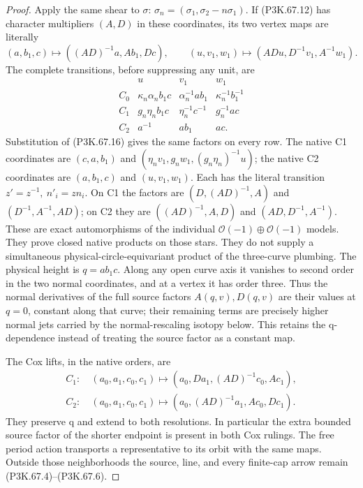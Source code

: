 \begin{proof}
Apply the same shear to \(\sigma\):
\(\sigma_n=(\sigma_1,\sigma_2-n\sigma_1)\). If (P3K.67.12) has
character multipliers \((A,D)\) in these coordinates, its two vertex
maps are literally
\[
 (a,b_1,c)\mapsto((AD)^{-1}a,Ab_1,Dc),\qquad
 (u,v_1,w_1)\mapsto(ADu,D^{-1}v_1,A^{-1}w_1).
 \tag{P3K.67.16}
\]
The complete transitions, before suppressing any unit, are
\[
\begin{array}{c|ccc}
 &u&v_1&w_1\\ \hline
 C_0&\kappa_n\alpha_n b_1c&\alpha_n^{-1}ab_1&\kappa_n^{-1}b_1^{-1}\\
 C_1&g_n\eta_n b_1c&\eta_n^{-1}c^{-1}&g_n^{-1}ac\\
 C_2&a^{-1}&ab_1&ac.
\end{array}
 \tag{P3K.67.17}
\]
Substitution of (P3K.67.16) gives the same factors on every row. The
native C1 coordinates are
\((c,a,b_1)\) and \((\eta_nv_1,g_nw_1,(g_n\eta_n)^{-1}u)\);
the native C2 coordinates are \((a,b_1,c)\) and \((u,v_1,w_1)\).
Each has the literal transition
\(z'=z^{-1},\ n'_i=zn_i\). On C1 the factors are
\((D,(AD)^{-1},A)\) and \((D^{-1},A^{-1},AD)\); on C2 they are
\(((AD)^{-1},A,D)\) and \((AD,D^{-1},A^{-1})\).
These are exact automorphisms of the individual
\(\mathcal O(-1)\oplus\mathcal O(-1)\) models. They prove closed
native products on those stars. They do not supply a simultaneous
physical-circle-equivariant product of the three-curve plumbing.
The physical height is \(q=ab_1c\). Along any open curve axis it
vanishes to second order in the two normal coordinates, and at a
vertex it has order three. Thus the normal derivatives of the full
source factors \(A(q,v),D(q,v)\) are their values at \(q=0\), constant
along that curve; their remaining terms are precisely higher normal
jets carried by the normal-rescaling isotopy below. This retains the
q-dependence instead of treating the source factor as a constant map.

The Cox lifts, in the native orders, are
\[
 \begin{aligned}
 C_1:&\ (a_0,a_1,c_0,c_1)
       \mapsto(a_0,Da_1,(AD)^{-1}c_0,Ac_1),\\
 C_2:&\ (a_0,a_1,c_0,c_1)
       \mapsto(a_0,(AD)^{-1}a_1,Ac_0,Dc_1).
 \end{aligned}
 \tag{P3K.67.18}
\]
They preserve q and extend to both resolutions. In particular the
extra bounded source factor of the shorter endpoint is present in
both Cox rulings. The free period action transports a representative
to its orbit with the same maps. Outside those neighborhoods the
source, line, and every finite-cap arrow remain (P3K.67.4)--(P3K.67.6).


\end{proof}
